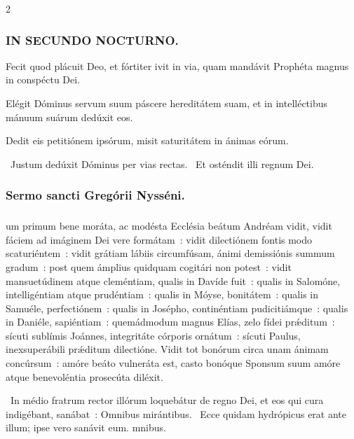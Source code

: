 \documentclass[9pt,twoside]{extarticle}
\begin{document}
\begin{multicols}{2}
{{{\subsubsection*{\center \textsc{IN SECUNDO NOCTURNO.}}
\begin{tightlist}{}
\item {} Fecit quod plácuit Deo, et fórtiter ivit in via, quam mandávit Prophéta magnus in conspéctu Dei.
\item {} Elégit Dóminus servum suum páscere hereditátem suam, et in intelléctibus mánuum suárum dedúxit eos.
\item {} Dedit eis petitiónem ipsórum, misit saturitátem in ánimas eórum.
\item {}~Justum dedúxit Dóminus per vias rectas. ~Et osténdit illi regnum Dei.
\end{tightlist}

\subsubsection*{\center Sermo sancti Gregórii Nysséni.}
\subsubsection*{\center {}}
um primum bene moráta, ac modésta Ecclésia beátum Andréam vidit, vidit fáciem ad imáginem Dei vere formátam~: vidit dilectiónem fontis modo scaturiéntem~: vidit grátiam lábiis circumfúsam, ánimi demissiónis summum gradum~: post quem ámplius quidquam cogitári non potest~: vidit mansuetúdinem atque cleméntiam, qualis in Davíde fuit~: qualis in Salomóne, intelligéntiam atque prudéntiam~: qualis in Móyse, bonitátem~: qualis in Samuéle, perfectiónem~: qualis in Josépho, continéntiam pudicitiámque~: qualis in Daniéle, sapiéntiam~: quemádmodum magnus Elías, zelo fídei prǽditum~: sícuti sublímis Joánnes, integritáte córporis ornátum~: sícuti Paulus, inexsuperábili prǽditum dilectióne. Vidit tot bonórum circa unam ánimam concúrsum~: amóre beáto vulneráta est, casto bonóque Sponsum suum amóre atque benevoléntia prosecúta diléxit.

\begin{tightlist}{}
\item {}~In médio fratrum rector illórum loquebátur de regno Dei, et eos qui cura indigébant, sanábat~: \textred{*} Omnibus mirántibus. ~Ecce quidam hydrópicus erat ante illum; ipse vero sanávit eum. mnibus.
\end{tightlist}

}}}
\end{multicols}
\end{document}
